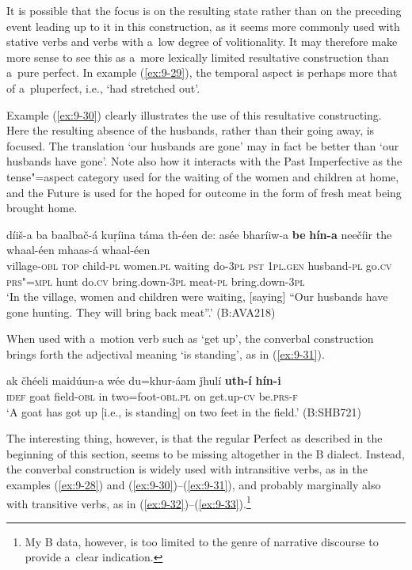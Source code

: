 It is possible that the focus is on the resulting state rather than on the preceding event leading up to it in this construction, as it seems more commonly used with stative verbs and verbs with a~low degree of volitionality. It may therefore make more sense to see this as a~more lexically limited resultative construction \citep[135]{dahl1985} than a~pure perfect. In example (\ref{ex:9-29}), the temporal aspect is perhaps more that of a~pluperfect, i.e., `had stretched out'. 



Example (\ref{ex:9-30}) clearly illustrates the use of this resultative constructing. Here the resulting absence of the husbands, rather than their going away, is focused. The translation `our husbands are gone' may in fact be better than `our husbands have gone'. Note also how it interacts with the Past Imperfective as the tense"=aspect category used for the waiting of the women and children at home, and the Future is used for the hoped for outcome in the form of fresh meat being brought home.

\ea
\label{ex:9-30}
\gll díiš-a ba baalbač-á kuṛíina táma th-éen de: asée bharíiw-a \textbf{be} \textbf{hín-a} neečíir the whaal-éen mhaas-á whaal-éen \\
village-\textsc{obl} \textsc{top} child-\textsc{pl} women.\textsc{pl} waiting  do-\textsc{3pl} \textsc{pst } \textsc{1pl.gen} husband-\textsc{pl} go.\textsc{cv} \textsc{prs"=mpl}  hunt do.\textsc{cv} bring.down-\textsc{3pl} meat-\textsc{pl} bring.down-\textsc{3pl} \\
\glt `In the village, women and children were waiting, [saying] ``Our husbands have gone hunting. They will bring back meat''.' (B:AVA218)
\z

When used with a~motion verb such as `get up', the converbal construction brings forth the adjectival meaning `is standing', as in (\ref{ex:9-31}).

\begin{exe}
\ex
\label{ex:9-31}
\gll ak čhéeli maidúun-a wée du=khur-áam ǰhulí \textbf{uth-í} \textbf{hín-i} \\
\textsc{idef} goat field-\textsc{obl} in two=foot-\textsc{obl.pl} on get.up-\textsc{cv} be.\textsc{prs-f} \\
\glt `A goat has got up [i.e., is standing] on two feet in the field.' (B:SHB721)
\end{exe}

The interesting thing, however, is that the regular Perfect as described in the beginning of this section, seems to be missing altogether in the B dialect. Instead, the converbal construction is widely used with intransitive verbs, as in the examples (\ref{ex:9-28}) and (\ref{ex:9-30})--(\ref{ex:9-31}), and probably marginally also with transitive verbs, as in (\ref{ex:9-32})--(\ref{ex:9-33}).\footnote{My B data, however, is too limited to the genre of narrative discourse to provide a~clear indication.}


